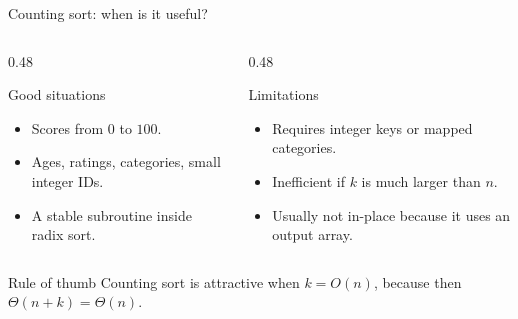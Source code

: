 \documentclass[aspectratio=169]{beamer}
\begin{document}
\begin{frame}{Counting sort: when is it useful?}
\small
\begin{columns}[T,onlytextwidth]
  \begin{column}{0.48\textwidth}
    \begin{exampleblock}{Good situations}
      \begin{itemize}\setlength{\itemsep}{0.2em}
        \item Scores from $0$ to $100$.
        \item Ages, ratings, categories, small integer IDs.
        \item A stable subroutine inside radix sort.
      \end{itemize}
    \end{exampleblock}
  \end{column}
  \begin{column}{0.48\textwidth}
    \begin{alertblock}{Limitations}
      \begin{itemize}\setlength{\itemsep}{0.2em}
        \item Requires integer keys or mapped categories.
        \item Inefficient if $k$ is much larger than $n$.
        \item Usually not in-place because it uses an output array.
      \end{itemize}
    \end{alertblock}
  \end{column}
\end{columns}
\vspace{0.4em}
\begin{block}{Rule of thumb}
  Counting sort is attractive when $k=O(n)$, because then
  $\Theta(n+k)=\Theta(n)$.
\end{block}
\end{frame}
\end{document}
